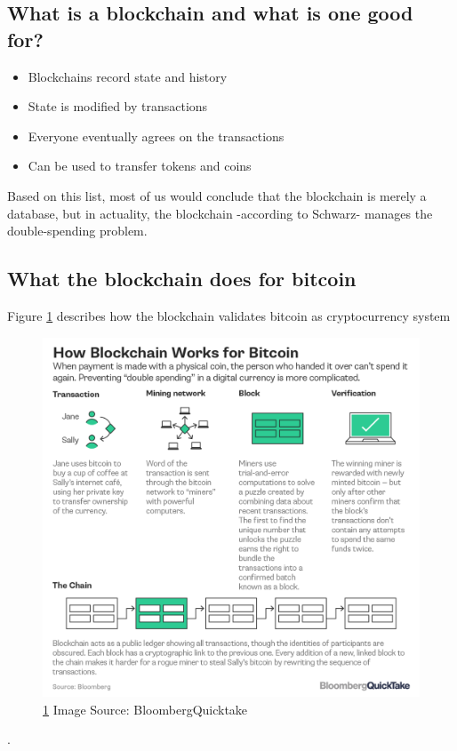 \documentclass[submission,copyright,creativecommons]{eptcs}
\begin{document}
\subsection{What is a blockchain and what is one good for?}
\begin{itemize}
\item Blockchains record state and history
\item State is modified by transactions
\item Everyone eventually agrees on the transactions
\item Can be used to transfer tokens and coins
\end{itemize}

Based on this list, most of us would conclude that the blockchain is merely a database, but in actuality, the blockchain -according to Schwarz\cite{cppconCppCon2016David}- manages the double-spending problem.

\subsection{What the blockchain does for bitcoin}

Figure \ref{fig:block_bloom} describes how the blockchain validates bitcoin as cryptocurrency system\cite{noauthor_bitcoin}
\begin{figure}[h]
    \centering
    \label{fig:block_bloom}
    \includegraphics[width=5in]{bitcoin-blockchain-bloomberg}
     \caption{\ref{fig:block_bloom} Image Source: BloombergQuicktake}
\end{figure}.
\end{document}
